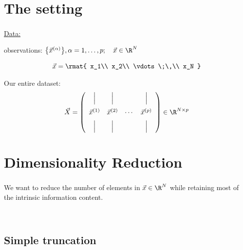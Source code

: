 \section{The setting}

\begin{frame}\frametitle{\secname}
    
\underline{Data:}

observations: $\big\{ \vec{x}^{(\alpha)} \big\}, \alpha = 1, \ldots, p; \quad \vec{x} \in \R^N$

$$
\vec x = \rmat{
x_1\\
x_2\\
\vdots\;\,\\
x_N
}
$$

Our entire dataset:
\[
\vec X = 
\left(
\begin{array}{cccc}
\Big| & \Big| & &\Big| \\[3mm]
\vec x^{(1)} & \vec x^{(2)} & \cdots &\vec x^{(p)}\\[2mm]
\Big| & \Big| & &\Big|
\end{array}
\right) \in \R^{N \times p}
\]

\end{frame}

\section{Dimensionality Reduction}

\begin{frame}\frametitle{\secname}
We want to reduce the number of elements in $\vec x \in \R^N$
while retaining most of the intrinsic information content.

\\


\end{frame}

\subsection{Simple truncation}


